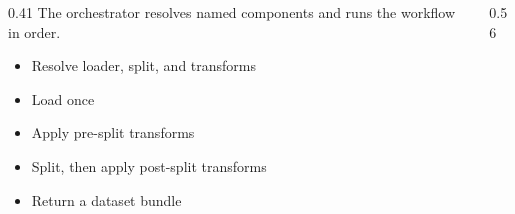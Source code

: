 \begin{frame}

  \vspace{14mm}
  \begin{columns}[T,onlytextwidth]
    \begin{column}{0.41\textwidth}
      {\small The orchestrator resolves named components and runs the workflow in order.}\par
      \vspace{1.5mm}
      \begin{itemize}
        \item Resolve loader, split, and transforms
        \item Load once
        \item Apply pre-split transforms
        \item Split, then apply post-split transforms
        \item Return a dataset bundle
      \end{itemize}
    \end{column}
    \begin{column}{0.56\textwidth}
      
    \end{column}
  \end{columns}

  \slideheaderfooter
\end{frame}
